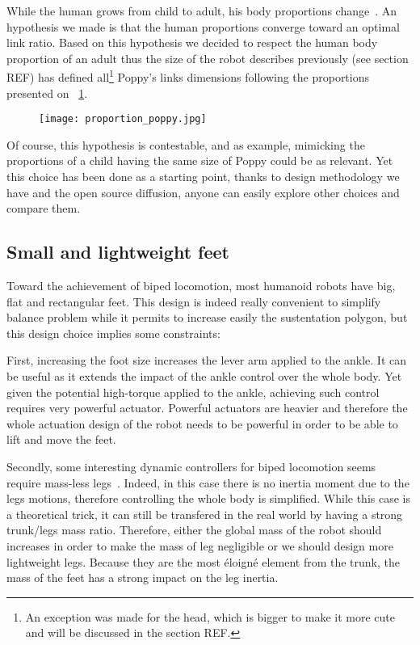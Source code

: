 While the human grows from child to adult, his body proportions change~\parencite{bogin2010leg}. An hypothesis we made is that the human proportions converge toward an optimal link ratio. Based on this hypothesis we decided to respect the human body proportion of an adult thus the size of the robot describes previously (see section REF) has defined all\footnote{An exception was made for the head, which is bigger to make it more cute and will be discussed in the section REF.} Poppy's links dimensions following the proportions presented on \figurename~\ref{fig:poppy-human-proportion}.

\begin{figure}[tb]
    \begin{center}
        \texttt{[image: proportion\_poppy.jpg]}
    \end{center}
    \caption{}
    \label{fig:poppy-human-proportion}
\end{figure}

Of course, this hypothesis is contestable, and as example, mimicking the proportions of a child having the same size of Poppy could be as relevant. Yet this choice has been done as a starting point, thanks to design methodology we have and the open source diffusion, anyone can easily explore other choices and compare them.

\subsection{Small and lightweight feet} %

Toward the achievement of biped locomotion, most humanoid robots have big, flat and rectangular feet. This design is indeed really convenient to simplify balance problem while it permits to increase easily the sustentation polygon, but this design choice implies some constraints:

First, increasing the foot size increases the lever arm applied to the ankle. It can be useful as it extends the impact of the ankle control over the whole body. Yet given the potential high-torque applied to the ankle, achieving such control requires very powerful actuator.
Powerful actuators are heavier and therefore the whole actuation design of the robot needs to be powerful in order to be able to lift and move the feet.

Secondly, some interesting dynamic controllers for biped locomotion seems require mass-less legs~\parencite{hyon2002development}. Indeed, in this case there is no inertia moment due to the legs motions, therefore controlling the whole body is simplified. While this case is a theoretical trick, it can still be transfered in the real world by having a strong trunk/legs mass ratio. Therefore, either the global mass of the robot should increases in order to make the mass of leg negligible or we should design more lightweight legs.
Because they are the most éloigné element from the trunk, the mass of the feet has a strong impact on the leg inertia.

